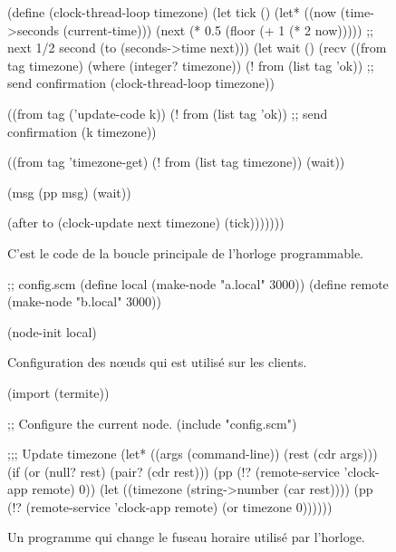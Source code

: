 \begin{figure}[h!]
  \centering
\begin{mplisting}{1}
(define (clock-thread-loop timezone)
  (let tick ()
    (let* ((now (time->seconds (current-time)))
           (next (* 0.5 (floor (+ 1 (* 2 now))))) ;; next 1/2 second
           (to (seconds->time next)))
      (let wait ()
        (recv
          ((from tag timezone) (where (integer? timezone))
           (! from (list tag 'ok)) ;; send confirmation
           (clock-thread-loop timezone))

          ((from tag ('update-code k))
           (! from (list tag 'ok)) ;; send confirmation
           (k timezone))

          ((from tag 'timezone-get)
           (! from (list tag timezone))
           (wait))

          (msg
           (pp msg)
           (wait))

          (after to
           (clock-update next timezone)
           (tick)))))))
\end{mplisting}
  \caption{C'est le code de la boucle principale de l'horloge programmable.}
  \label{fig:termite-clock@v1}
\end{figure}

\begin{figure}[h!]
\begin{center}
\begin{mplisting}{1}
;; config.scm
(define local (make-node "a.local" 3000))
(define remote (make-node "b.local" 3000))

(node-init local)
\end{mplisting}
\end{center}
  \caption{Configuration des nœuds qui est utilisé sur les clients.}
  \vspace*{4ex}
\end{figure}

\begin{figure}[h!]
\begin{center}
\begin{mplisting}{1}
(import (termite))

;; Configure the current node.
(include "config.scm")

;;; Update timezone
(let* ((args (command-line))
       (rest (cdr args)))
  (if (or (null? rest)
          (pair? (cdr rest)))
      (pp (!? (remote-service 'clock-app remote) 0))
      (let ((timezone (string->number (car rest))))
        (pp (!? (remote-service 'clock-app remote) (or timezone 0))))))
\end{mplisting}
\end{center}
  \caption{Un programme qui change le fuseau horaire utilisé par
    l'horloge.}
  \vspace*{4ex}
\end{figure}

